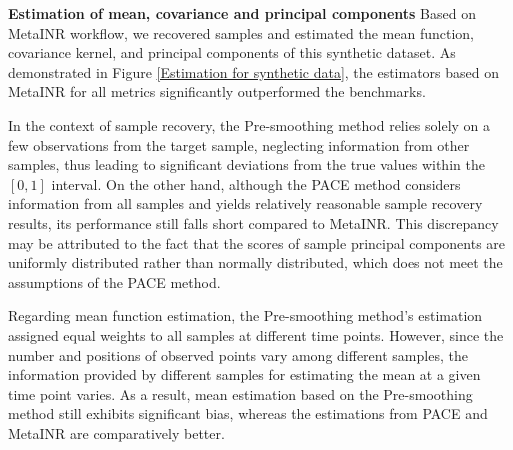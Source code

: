 \documentclass{article}
\begin{document}
\textbf{Estimation of mean, covariance and principal components}
Based on MetaINR workflow, we recovered samples and estimated the mean function, covariance kernel, and principal components of this synthetic dataset. 
As demonstrated in Figure \ref{Estimation for synthetic data},
the estimators based on MetaINR for all metrics significantly outperformed the benchmarks. 

In the context of sample recovery, 
the Pre-smoothing method relies solely on a few observations from the target sample, 
neglecting information from other samples, 
thus leading to significant deviations from the true values within the $[0,1]$ interval. 
On the other hand, although the PACE method considers information from all samples and yields relatively reasonable sample recovery results, 
its performance still falls short compared to MetaINR. 
This discrepancy may be attributed to the fact that the scores of sample principal components are uniformly distributed rather than normally distributed, which does not meet the assumptions of the PACE method.

Regarding mean function estimation, the Pre-smoothing method's estimation  assigned equal weights to all samples at different time points. 
However, since the number and positions of observed points vary among different samples, the information provided by different samples for estimating the mean at a given time point varies. 
As a result, mean estimation based on the Pre-smoothing method still exhibits significant bias, whereas the estimations from PACE and MetaINR are comparatively better.
\end{document}
